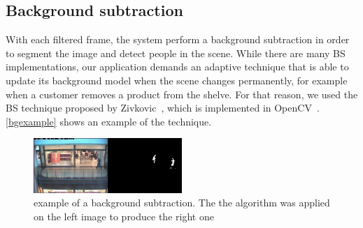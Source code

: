 \documentclass[10pt, conference]{IEEEtran}
\begin{document}
	\subsection{Background subtraction}
	With each filtered frame, the system perform a background subtraction in order to segment the image and detect people in the scene. While there are many BS implementations, our application demands an adaptive technique that is able to update its background model when the scene changes permanently, for example when a customer removes a product from the shelve. For that reason, we used the BS technique proposed by Zivkovic~\cite{zivkovic2004improved}, which is implemented in OpenCV~\cite{opencv_library}. \autoref{bgexample} shows an example of the technique.
	\begin{figure}[H]
		\includegraphics[width=0.5\textwidth]{figs/bgexample}
		\centering
		\caption{example of a background subtraction. The the algorithm was applied on the left image to produce the right one}
		\label{bgexample}
	\end{figure}
\end{document}
